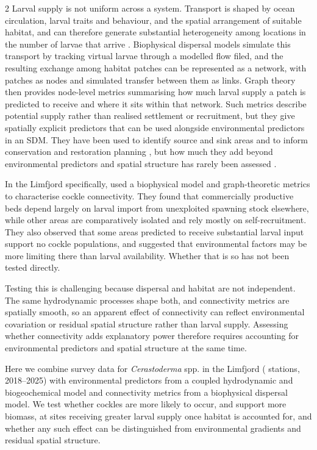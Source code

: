 \begin{spacing}{2}
Larval supply is not uniform across a system. Transport is shaped by ocean circulation, larval traits and behaviour, and the spatial arrangement of suitable habitat, and can therefore generate substantial heterogeneity among locations in the number of larvae that arrive \citep{cowenLarvalDispersalMarine2009,
siegelStochasticNatureLarval2008}. Biophysical dispersal models simulate this transport by tracking virtual larvae through a modelled flow filed, and the resulting exchange among habitat patches can be represented as a network, with patches as nodes and simulated transfer between them as links. Graph theory then provides node-level metrics summarising how much larval supply a patch is predicted to receive and where it sits within that network. Such metrics describe potential supply rather than realised settlement or recruitment, but they give spatially explicit predictors that can be used alongside environmental predictors in an SDM. They have been used to identify source and sink areas and to inform conservation and restoration planning
\citep{hansenAssessingDemographicConnectivity2024,
griecoDesigningDispersalConnectivityinformed2026}, but how much they add beyond environmental predictors and spatial structure has rarely been assessed \citep[but see][]{cecinoTestingInfluenceSeascape2021}.

In the Limfjord specifically, \citet{hansenAssessingDemographicConnectivity2024} used a biophysical model and graph-theoretic metrics to characterise cockle connectivity. They found that commercially productive beds depend largely on larval
import from unexploited spawning stock elsewhere, while other areas are comparatively isolated and rely mostly on self-recruitment. They also observed that some areas predicted to receive substantial larval input support no cockle populations, and suggested that environmental factors may be more limiting there than larval availability. Whether that is so has not been tested directly.

Testing this is challenging because dispersal and habitat are not independent. The same hydrodynamic processes shape both, and connectivity metrics are spatially smooth, so an apparent effect of connectivity can reflect environmental covariation or residual spatial structure rather than larval supply. Assessing whether connectivity
adds explanatory power therefore requires accounting for environmental predictors and spatial structure at the same time.

Here we combine survey data for \textit{Cerastoderma} spp. in the Limfjord ( stations, 2018--2025) with environmental predictors from a coupled hydrodynamic and biogeochemical model and connectivity metrics from a biophysical dispersal model. We test whether cockles are more likely to occur, and support more biomass, at sites receiving greater larval supply once habitat is accounted for, and whether any such effect can be distinguished from environmental gradients and residual spatial structure.



\end{spacing}

